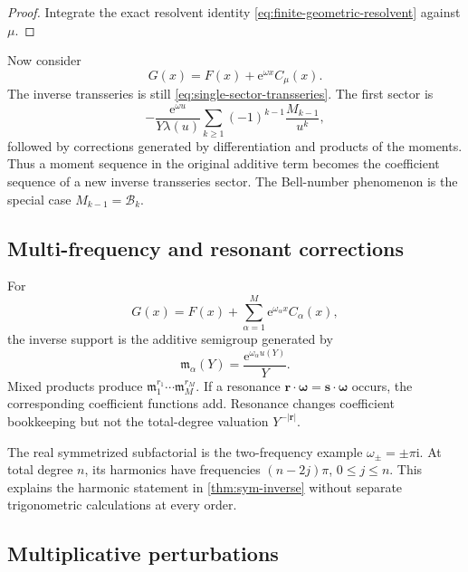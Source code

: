 \documentclass[11pt]{article}
\numberwithin{equation}{section}
\theoremstyle{mainthm}
\theoremstyle{defstyle}
\theoremstyle{remark}
\newcommand{\e}{\mathrm e}
\newcommand{\ii}{\mathrm i}
\newcommand{\Bell}{\mathcal B}
\begin{document}
\begin{proof}
Integrate the exact resolvent identity \cref{eq:finite-geometric-resolvent} against \(\mu\).
\end{proof}

Now consider
\begin{equation}\label{eq:moment-perturbed-G}
 G(x)=F(x)+\e^{\omega x}C_\mu(x).
\end{equation}
The inverse transseries is still \cref{eq:single-sector-transseries}.  The first sector is
\begin{equation}\label{eq:moment-first-inverse-sector}
 -\frac{\e^{\omega u}}{Y\lambda(u)}
 \sum_{k\ge1}(-1)^{k-1}\frac{M_{k-1}}{u^k},
\end{equation}
followed by corrections generated by differentiation and products of the moments.  Thus a moment sequence in the original additive term becomes the coefficient sequence of a new inverse transseries sector.  The Bell-number phenomenon is the special case
\(
 M_{k-1}=\Bell_k
\).

\subsection{Multi-frequency and resonant corrections}

For
\begin{equation}\label{eq:general-multifrequency-G}
 G(x)=F(x)+\sum_{\alpha=1}^{M}\e^{\omega_\alpha x}C_\alpha(x),
\end{equation}
the inverse support is the additive semigroup generated by
\begin{equation}\label{eq:basic-inverse-monomials}
 \mathfrak m_\alpha(Y)=\frac{\e^{\omega_\alpha u(Y)}}{Y}.
\end{equation}
Mixed products produce \(\mathfrak m_1^{r_1}\cdots\mathfrak m_M^{r_M}\).  If a resonance
\(
 \bm r\cdot\bm\omega=\bm s\cdot\bm\omega
\)
occurs, the corresponding coefficient functions add.  Resonance changes coefficient bookkeeping but not the total-degree valuation \(Y^{-\lvert\bm r\rvert}\).

The real symmetrized subfactorial is the two-frequency example \(\omega_\pm=\pm\pi\ii\).  At total degree \(n\), its harmonics have frequencies \((n-2j)\pi\), \(0\le j\le n\).  This explains the harmonic statement in \cref{thm:sym-inverse} without separate trigonometric calculations at every order.

\subsection{Multiplicative perturbations}
\end{document}

